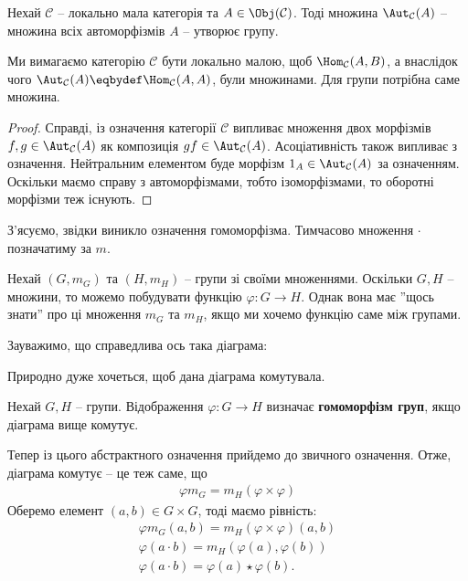 \documentclass{math_library}
\begin{document}
\begin{proposition}
Нехай $\mathcal{C}$ -- локально мала категорія та $A \in \Obj(\mathcal{C})$. Тоді множина $\Aut_\mathcal{C}(A)$ -- множина всіх автоморфізмів $A$ -- утворює групу. 
\end{proposition}

\begin{remark}
Ми вимагаємо категорію $\mathcal{C}$ бути локально малою, щоб $\Hom_\mathcal{C}(A,B)$, а внаслідок чого $\Aut_\mathcal{C}(A) \eqbydef \Hom_\mathcal{C}(A,A)$, були множинами. Для групи потрібна саме множина.
\end{remark}

\begin{proof}
Справді, із означення категорії $\mathcal{C}$ випливає множення двох морфізмів $f,g \in \Aut_\mathcal{C}(A)$ як композиція $gf \in \Aut_\mathcal{C}(A)$. Асоціативність також випливає з означення. Нейтральним елементом буде морфізм $1_A \in \Aut_\mathcal{C}(A)$ за означенням. Оскільки маємо справу з автоморфізмами, тобто ізоморфізмами, то оборотні морфізми теж існують.
\end{proof}

З'ясуємо, звідки виникло означення гомоморфізма. Тимчасово множення $\cdot$  позначатиму за $m$.

Нехай $(G,m_G)$ та $(H,m_H)$ -- групи зі своїми множеннями. Оскільки $G,H$ -- множини, то можемо побудувати функцію $\varphi \colon G \to H$. Однак вона має ''щось знати'' про ці множення $m_G$ та $m_H$, якщо ми хочемо функцію саме між групами.

Зауважимо, що справедлива ось така діаграма:
\begin{figure}[H]
\centering
{}
\end{figure}
Природно дуже хочеться, щоб дана діаграма комутувала.

\begin{definition}
Нехай $G,H$ -- групи. Відображення $\varphi \colon G \to H$ визначає \textbf{гомоморфізм груп}, якщо діаграма вище комутує. 
\end{definition}

Тепер із цього абстрактного означення прийдемо до звичного означення. Отже, діаграма комутує -- це теж саме, що
\begin{align*}
\varphi m_G = m_H (\varphi \times \varphi)
\end{align*}
Оберемо елемент $(a,b) \in G \times G$, тоді маємо рівність:
\begin{align*}
\varphi m_G(a,b) = m_H (\varphi \times \varphi) (a,b) \\
\varphi (a \cdot b) = m_H ( \varphi(a),\varphi(b)) \\
\varphi(a \cdot b) = \varphi(a) \star \varphi(b).
\end{align*}
\end{document}
